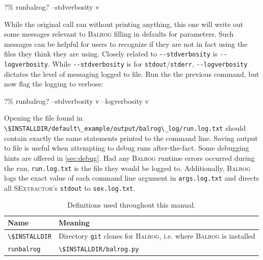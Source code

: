 \documentclass[12pt]{book}
\newcommand{\codett}[1]{\lstinline{#1}}
\newcommand{\balrog}{\textsc{Balrog}}
\newcommand{\sex}{\textsc{SExtractor}}
\newcommand{\opt}[1]{\codett{--#1}}
\newcommand{\bcmd}{\% runbalrog}
\begin{document}
\begin{cmdline}
?\bcmd{}? --stdverbosity v
\end{cmdline}

\noindent While the original call ran without printing anything, this one will write out some messages
relevant to \balrog{} filling in defaults for parameters.
Such messages can be helpful for users to recognize 
if they are not in fact using the files they think they are using.
Closely related to \opt{stdverbosity} is \opt{logverbosity}.
While \opt{stdverbosity} is for \codett{stdout}/\codett{stderr},
\opt{logverbosity} dictates the level of messaging logged to file.
Run the the previous command, but now flag the logging to verbose:

\begin{cmdline}
?\bcmd? --stdverbosity v --logverbosity v
\end{cmdline}

\noindent Opening the file found in \codett{\$INSTALLDIR/default\_example/output/balrog\_log/run.log.txt}
should contain exactly the same statements printed to the command line.
Saving output to file is useful when attempting to debug runs after-the-fact.
Some debugging hints are offered in \autoref{sec:debug}.
Had any \balrog{} runtime errors occurred during the run,
\codett{run.log.txt} is the file they would be logged to.
Additionally, \balrog{} logs the exact value of each command line argument  in \codett{args.log.txt}
and directs all \sex{}'s \codett{stdout} to \codett{sex.log.txt}.

\begin{table}
\caption{Definitions used throughout this manual.}
\label{tab:def}
\begin{tabular}{l l}
\toprule
\textbf{Name} & \textbf{Meaning} \\ \midrule \midrule
\codett{\$INSTALLDIR} & Directory \codett{git} clones for \balrog{}, i.e. where \balrog{} is installed \\
\codett{runbalrog} & \codett{\$INSTALLDIR/balrog.py} \\ \bottomrule
\end{tabular}
\end{table}
\end{document}
